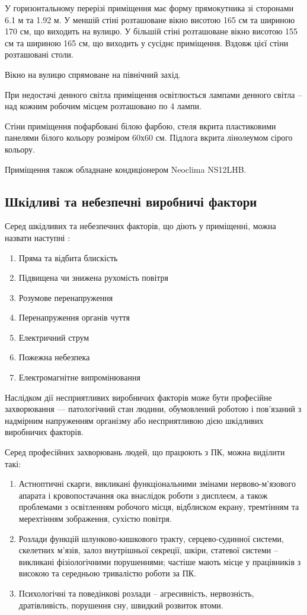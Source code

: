 \documentclass[a4paper,12pt]{article}
\begin{document}
У горизонтальному перерізі приміщення має форму прямокутника зі сторонами 6.1 м та 1.92 м. У меншій стіні розташоване вікно висотою 165 см та шириною 170 см, що виходить на вулицю. У більшій стіні розташоване вікно  висотою 155 см та шириною 165 см, що виходить у сусіднє приміщення. Вздовж цієї стіни розташовані столи.

Вікно на вулицю спрямоване на північний захід.

При недостачі денного світла приміщення освітлюється лампами денного світла -- над кожним робочим місцем розташовано по 4 лампи.

Стіни приміщення пофарбовані білою фарбою, стеля вкрита пластиковими панелями білого кольору розміром 60х60 см. Підлога вкрита лінолеумом сірого кольору.

Приміщення також обладнане кондиціонером Neoclima NS12LHB.

\subsection{Шкідливі та небезпечні виробничі фактори}
Серед шкідливих та небезпечних факторів, що діють у приміщенні, можна назвати наступні \cite{gost12}:
\begin{enumerate}
\item Пряма та відбита блискість
\item Підвищена чи знижена рухомість повітря
\item Розумове перенапруження
\item Перенапруження органів чуття
\item Електричний струм
\item Пожежна небезпека
\item Електромагнітне випромінювання
\end{enumerate}

Наслідком дії несприятливих виробничих факторів може бути професійне захворювання — патологічний стан людини, обумовлений роботою і пов’язаний з надмірним напруженням організму або несприятливою дією шкідливих виробничих факторів.

Серед професійних захворювань людей, що працюють з ПК, можна виділити такі:
\begin{enumerate}
\item Астноптичні скарги, викликані функціональними змінами нервово-м’язового апарата і кровопостачання ока внаслідок роботи з дисплеєм, а також проблемами з освітленням робочого місця, відблиском екрану, тремтінням та мерехтінням зображення, сухістю повітря.
\item Розлади функцій шлунково-кишкового тракту, серцево-судинної системи, скелетних м’язів, залоз внутрішньої секреції, шкіри, статевої системи -- викликані фізіологічними порушеннями; частіше мають місце у працівників з високою та середньою тривалістю роботи за ПК.
\item Психологічні та поведінкові розлади -- агресивність, нервозність, дратівливість, порушення сну, швидкий розвиток втоми.
\end{enumerate}
\end{document}
